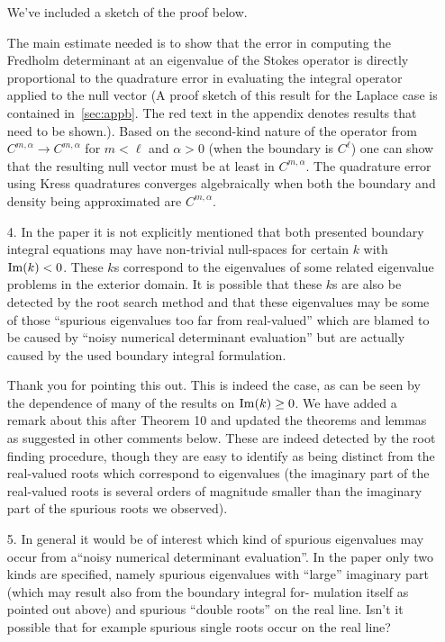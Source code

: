 \documentclass{article}
\begin{document}
\begin{itemize}
We've included a sketch of the proof below. 

The main estimate needed is to show that the error in computing
the Fredholm determinant at an eigenvalue of the Stokes operator
is directly proportional to the quadrature error in 
evaluating the integral operator applied to the null vector (A proof sketch 
of this result for the Laplace case is contained in~\cref{sec:appb}. 
The red text in the appendix denotes results that need to be shown.). 
Based on the second-kind nature of the operator from $C^{m,\alpha} \to C^{m,\alpha}$
for $m<\ell$ and $\alpha>0$ (when the boundary is $C^{\ell}$) one can show
that the resulting null vector must be at least in $C^{m,\alpha}$.
The quadrature error using Kress quadratures converges algebraically
when both the boundary and density being approximated are $C^{m,\alpha}$. 

\item[4.] {\color{blue} In the paper it is not explicitly mentioned that
  both presented boundary integral equations may have non-trivial null-spaces
  for certain $k$ with ${\rm Im}(k) < 0$. These $k$s correspond to the eigenvalues of some
  related eigenvalue problems in the exterior domain. It is possible that
  these $k$s are also be detected by the root search method and that these
  eigenvalues may be some of those “spurious eigenvalues too far from
  real-valued” which are blamed to be caused by “noisy numerical determinant
  evaluation” but are actually caused by the used boundary integral formulation.}

Thank you for pointing this out. This is indeed the case, as can be seen
by the dependence of many of the results on ${\rm Im}(k) \geq 0$. We have
added a remark about this after Theorem 10 and updated the theorems and lemmas
as suggested in other comments below. These are indeed detected by the
root finding procedure, though they are easy to identify as
being distinct from the real-valued roots which correspond to
eigenvalues (the imaginary part of the real-valued roots is several
orders of magnitude smaller than the imaginary part of the
spurious roots we observed).

\item[5.] {\color{blue}
  In general it would be of interest which kind of spurious eigenvalues may
occur from a“noisy numerical determinant evaluation”. In the paper
only two kinds are specified, namely spurious eigenvalues with “large”
imaginary part (which may result also from the boundary integral for-
mulation itself as pointed out above) and spurious “double roots” on
the real line. Isn’t it possible that for example spurious single roots
occur on the real line?}


\end{itemize}
\end{document}
